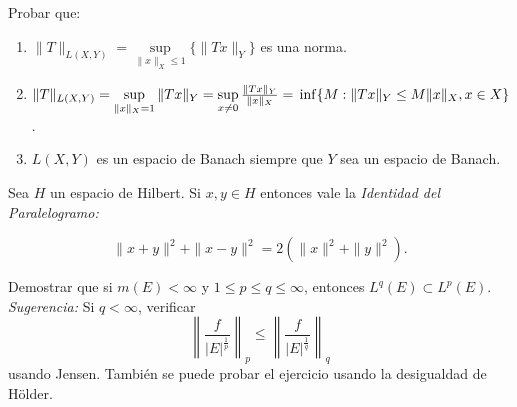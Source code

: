 \documentclass{book}
\begin{document}
 
\begin{ejer}{} Probar que: 
		\begin{enumerate}
	\item 
$\|T\|_{L(X,Y)}=\sup\limits_{\|x\|_{X}\leq 1}\{\|Tx\|_{Y}\}$
es una norma.
	\item 
 $\|T\|_{L(X,Y)}=\sup\limits_{\|x\|_{X}=1}\|Tx\|_{Y}=
\sup\limits_{x \not =0}\frac{\|Tx\|_{Y}}{\|x\|_{X}}=
\\
\inf\{M:\|Tx\|_{Y}\leq M \|x\|_{X}, x\in X\}$.
\item $L(X,Y)$ es un espacio de Banach siempre que $Y$ sea un espacio de Banach.
		\end{enumerate}
\end{ejer}
		
 
		
\begin{ejer}{} 
Sea $H$ un espacio de Hilbert. Si $x,y\in H$ entonces vale la {\it{Identidad del Paralelogramo:}}

 $$\|x+y\|^2+\|x-y\|^2=2(\|x\|^2+\|y\|^2). $$
 \end{ejer}
 


	
	
	
	\begin{ejer}{}
 Demostrar que si $m(E)<\infty$ y $1\leq p\leq q \leq \infty$, entonces 
$L^{q}(E)\subset L^{p}(E)$.
\\
{\it Sugerencia:} Si $q<\infty$, verificar 
$$\left\|\frac{f}{|E|^{\frac{1}{p}}}\right\|_p\leq
\left\|\frac{f}{|E|^{\frac{1}{q}}}\right\|_q$$
usando Jensen.
Tambi\'en se puede probar el ejercicio usando la desigualdad de H\"older.
\end{ejer}
\end{document}
